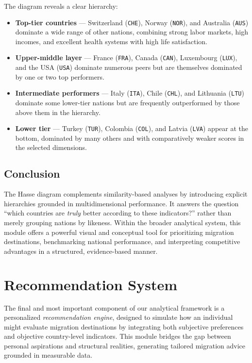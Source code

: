 \documentclass[11pt]{article}
\begin{document}
\noindent
The diagram reveals a clear hierarchy:
\begin{itemize}
    \item \textbf{Top-tier countries} — Switzerland (\texttt{CHE}), Norway (\texttt{NOR}), and Australia (\texttt{AUS}) dominate a wide range of other nations, combining strong labor markets, high incomes, and excellent health systems with high life satisfaction.
    \item \textbf{Upper-middle layer} — France (\texttt{FRA}), Canada (\texttt{CAN}), Luxembourg (\texttt{LUX}), and the USA (\texttt{USA}) dominate numerous peers but are themselves dominated by one or two top performers.
    \item \textbf{Intermediate performers} — Italy (\texttt{ITA}), Chile (\texttt{CHL}), and Lithuania (\texttt{LTU}) dominate some lower-tier nations but are frequently outperformed by those above them in the hierarchy.
    \item \textbf{Lower tier} — Turkey (\texttt{TUR}), Colombia (\texttt{COL}), and Latvia (\texttt{LVA}) appear at the bottom, dominated by many others and with comparatively weaker scores in the selected dimensions.
\end{itemize}

\subsection{Conclusion}

\noindent
The Hasse diagram complements similarity-based analyses by introducing explicit hierarchies grounded in multidimensional performance.  
It answers the question “which countries are \emph{truly} better according to these indicators?” rather than merely grouping nations by likeness.  
Within the broader analytical system, this module offers a powerful visual and conceptual tool for prioritizing migration destinations, benchmarking national performance, and interpreting competitive advantages in a structured, evidence-based manner.



\newpage

\section{Recommendation System}

\noindent
The final and most important component of our analytical framework is a personalized \textit{recommendation engine}, designed to simulate how an individual might evaluate migration destinations by integrating both subjective preferences and objective country-level indicators.
This module bridges the gap between personal aspirations and structural realities, generating tailored migration advice grounded in measurable data.
\end{document}
